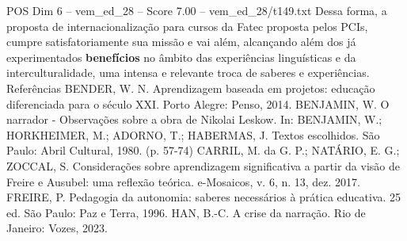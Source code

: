 \begin{textsample}{POS Dim 6 – vem\_ed\_28 – Score 7.00 – vem\_ed\_28/t149.txt}
Dessa forma, a proposta de internacionalização para cursos da Fatec proposta pelos PCIs, cumpre satisfatoriamente sua missão e vai além, alcançando além dos já experimentados \textbf{benefícios} no âmbito das experiências linguísticas e da interculturalidade, uma intensa e relevante troca de saberes e experiências.
Referências BENDER, W.
N.
Aprendizagem baseada em projetos: educação diferenciada para o século XXI.
Porto Alegre: Penso, 2014.
BENJAMIN, W.
O narrador - Observações sobre a obra de Nikolai Leskow.
In: BENJAMIN, W.; HORKHEIMER, M.; ADORNO, T.; HABERMAS, J.
Textos escolhidos.
São Paulo: Abril Cultural, 1980. (p. 57-74) CARRIL, M. da G.
P.; NATÁRIO, E.
G.; ZOCCAL, S.
Considerações sobre aprendizagem significativa a partir da visão de Freire e Ausubel: uma reflexão teórica. e-Mosaicos, v. 6, n. 13, dez. 2017.
FREIRE, P.
Pedagogia da autonomia: saberes necessários à prática educativa. 25 ed.
São Paulo: Paz e Terra, 1996.
HAN, B.-C.
A crise da narração.
Rio de Janeiro: Vozes, 2023.

\end{textsample}
